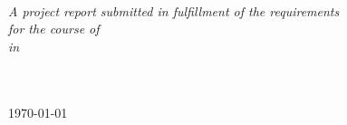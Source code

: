 \documentclass[
11pt, 
oneside,
english,
onehalfspacing,
onehalfspacing,
parskip,
headsepline,
chapterinoneline,
]{MastersDoctoralThesis}
\begin{document}
\begin{titlepage}
\begin{center}
\begin{minipage}[t]{0.4\textwidth}
\begin{flushright}
\cosupname
\end{flushright}
\end{minipage}\\[0.5cm]

\vfill

\large \textit{A project report submitted in fulfillment of the requirements\\ for the course of
\degreename}\\[0.25cm]
\textit{in}\\[0.25cm]
\groupname\\\deptname\\[1cm]
 
\vfill

{\addressname \text{, } \large \today}\\[4cm]
 
\vfill
\end{center}
\end{titlepage}

\end{document}
